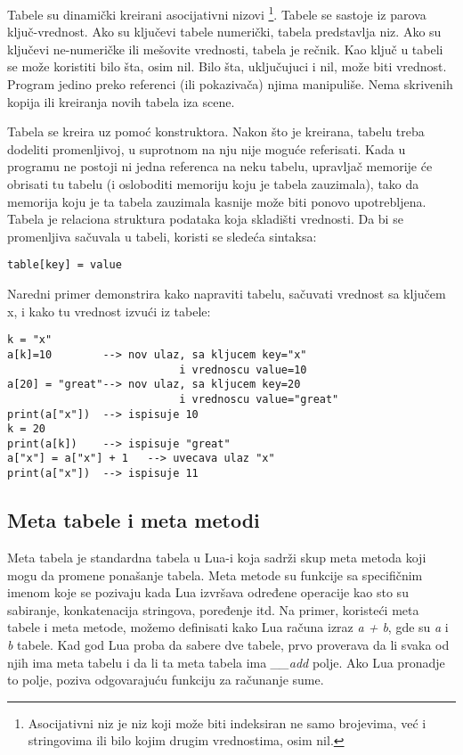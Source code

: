 \documentclass[a4paper]{article}
\begin{document}

Tabele su dinamički kreirani asocijativni nizovi \footnote{Asocijativni niz je niz koji može biti indeksiran ne samo brojevima, već i stringovima ili bilo kojim drugim vrednostima, osim nil.}. Tabele se sastoje iz parova ključ-vrednost. Ako su ključevi tabele numerički, tabela predstavlja niz. Ako su ključevi ne-numeričke ili mešovite vrednosti, tabela je rečnik. Kao ključ u tabeli se može koristiti bilo šta, osim nil. Bilo šta, uključujuci i nil, može biti vrednost.
Program jedino preko referenci (ili pokazivača) njima manipuliše. Nema skrivenih kopija ili kreiranja novih tabela iza scene.

Tabela se kreira uz pomoć konstruktora. Nakon što je kreirana, tabelu treba dodeliti promenljivoj, u suprotnom na nju nije moguće referisati. Kada u programu ne postoji ni jedna referenca na neku tabelu, upravljač memorije će obrisati tu tabelu (i osloboditi memoriju koju je tabela zauzimala), tako da memorija koju je ta tabela zauzimala kasnije može biti ponovo upotrebljena. Tabela je relaciona struktura podataka koja skladišti vrednosti. Da bi se promenljiva sačuvala u tabeli, koristi se sledeća sintaksa:
\begin{verbatim}
table[key] = value
\end{verbatim}
Naredni primer demonstrira kako napraviti tabelu, sačuvati vrednost sa ključem x, i kako tu vrednost izvući iz tabele: %
\begin{lstlisting}[caption={Primer čuvanja vrednosti u tabeli},frame=single, label=tabela1]
k = "x"
a[k]=10        --> nov ulaz, sa kljucem key="x" 
                           i vrednoscu value=10
a[20] = "great"--> nov ulaz, sa kljucem key=20 
                           i vrednoscu value="great"
print(a["x"])  --> ispisuje 10
k = 20
print(a[k])    --> ispisuje "great"
a["x"] = a["x"] + 1   --> uvecava ulaz "x"
print(a["x"])  --> ispisuje 11
\end{lstlisting}


\subsection*{Meta tabele i meta metodi}
Meta tabela je standardna tabela u Lua-i koja sadrži skup meta metoda koji mogu da promene ponašanje tabela. Meta metode su funkcije sa specifičnim imenom koje se pozivaju kada Lua izvršava određene operacije kao sto su sabiranje, konkatenacija stringova, poređenje itd. Na primer, koristeći meta tabele i meta metode, možemo definisati kako Lua računa izraz \textit{a + b}, gde su \textit{a} i \textit{b} tabele. Kad god Lua proba da sabere dve tabele, prvo proverava da li svaka od njih ima meta tabelu i da li ta meta tabela ima \textit{\_\_add} polje. Ako Lua pronadje to polje, poziva odgovarajuću funkciju za računanje sume.
\end{document}
